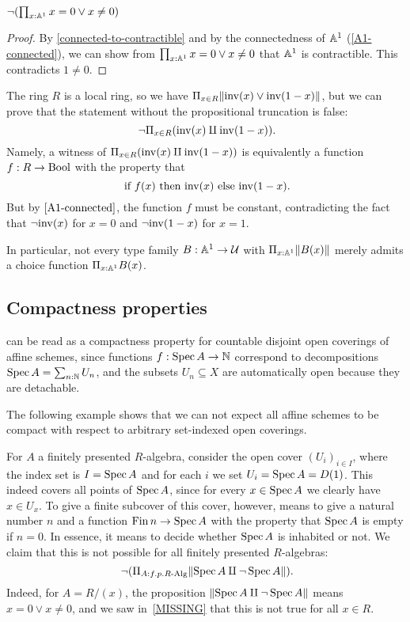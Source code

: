 \begin{corollary}%
  $\neg(\prod_{x:\mathbb{A}^1}x=0 \vee x\neq 0)$
\end{corollary}

\begin{proof}
  By \cref{connected-to-contractible} and by the connectedness of $\mathbb{A}^1$ (\cref{A1-connected}),
  we can show from $\prod_{x:\mathbb{A}^1}x=0 \vee x\neq 0$ that $\mathbb{A}^1$ is contractible.
  This contradicts $1\neq 0$.
\end{proof}

\begin{example}
  The ring $R$ is a local ring, so we have
  $\Pi_{x \in R} \lVert \mathrm{inv}(x) \lor \mathrm{inv}(1 - x) \rVert$,
  but we can prove that
  the statement without the propositional truncation is false:
  \[ \lnot \Pi_{x \in R} (\inv(x) \amalg \inv(1 - x)) \rlap{.} \]
  Namely,
  a witness of $\Pi_{x \in R} (\mathrm{inv}(x) \amalg \mathrm{inv}(1 - x))$
  is equivalently a function $f : R \to \mathrm{Bool}$
  with the property that
  \[ \text{if $f(x)$ then $\inv(x)$ else $\inv(1 - x)$} \rlap{.} \]
  But by $\cref{A1-connected}$,
  the function $f$ must be constant,
  contradicting the fact that
  $\lnot\mathrm{inv}(x)$ for $x = 0$ and $\lnot\mathrm{inv}(1 - x)$ for $x = 1$.

  In particular,
  not every type family $B : \mathbb{A}^1 \to \mathcal{U}$ with $\Pi_{x : \mathbb{A}^1} \lVert B(x) \rVert$
  merely admits a choice function $\Pi_{x : \mathbb{A}^1} B(x)$.
\end{example}

\subsection{Compactness properties}

 can be read as a compactness property
for countable disjoint open coverings of affine schemes,
since functions $f : \operatorname{Spec} A \to \mathbb{N}$
correspond to decompositions $\operatorname{Spec} A = \sum_{n : \mathbb{N}} U_n$,
and the subsets $U_n \subseteq X$ are automatically open
because they are detachable.

The following example shows that we can not expect all affine schemes
to be compact with respect to arbitrary set-indexed open coverings.

\begin{example}
  For $A$ a finitely presented $R$-algebra,
  consider the open cover ${(U_i)}_{i \in I}$,
  where the index set is $I = \operatorname{Spec} A$
  and for each $i$ we set $U_i = \operatorname{Spec} A = D(1)$.
  This indeed covers all points of $\operatorname{Spec} A$,
  since for every $x \in \operatorname{Spec} A$ we clearly have $x \in U_x$.
  To give a finite subcover of this cover, however,
  means to give a natural number $n$ and a function $\operatorname{Fin} n \to \operatorname{Spec} A$
  with the property that $\operatorname{Spec} A$ is empty if $n = 0$.
  In essence, it means to decide whether $\operatorname{Spec} A$ is inhabited or not.
  We claim that this is not possible for all finitely presented $R$-algebras:
  \[ \lnot (\Pi_{A : f.p. R\text{-Alg}} \propTrunc{\Spec A \amalg \lnot \Spec A} )
     \rlap{.} \]
  Indeed, for $A = R/(x)$,
  the proposition $\lVert \operatorname{Spec} A \amalg \lnot \operatorname{Spec} A \rVert$
  means $x = 0 \lor x \neq 0$,
  and we saw in~\ref{MISSING} that this is not true for all $x \in R$.
\end{example}

